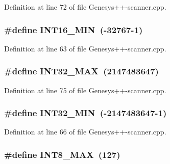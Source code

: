 Definition at line 72 of file Genesys++-\/scanner.\-cpp.

\hypertarget{_genesys_09_09-scanner_8cpp_ad4e9955955b27624963643eac448118a}{
\subsubsection[{I\-N\-T16\-\_\-\-M\-I\-N}]{\setlength{\rightskip}{0pt plus 5cm}\#define I\-N\-T16\-\_\-\-M\-I\-N~(-\/32767-\/1)}}\label{_genesys_09_09-scanner_8cpp_ad4e9955955b27624963643eac448118a}


Definition at line 63 of file Genesys++-\/scanner.\-cpp.

\hypertarget{_genesys_09_09-scanner_8cpp_a181807730d4a375f848ba139813ce04f}{
\subsubsection[{I\-N\-T32\-\_\-\-M\-A\-X}]{\setlength{\rightskip}{0pt plus 5cm}\#define I\-N\-T32\-\_\-\-M\-A\-X~(2147483647)}}\label{_genesys_09_09-scanner_8cpp_a181807730d4a375f848ba139813ce04f}


Definition at line 75 of file Genesys++-\/scanner.\-cpp.

\hypertarget{_genesys_09_09-scanner_8cpp_a688eb21a22db27c2b2bd5836943cdcbe}{
\subsubsection[{I\-N\-T32\-\_\-\-M\-I\-N}]{\setlength{\rightskip}{0pt plus 5cm}\#define I\-N\-T32\-\_\-\-M\-I\-N~(-\/2147483647-\/1)}}\label{_genesys_09_09-scanner_8cpp_a688eb21a22db27c2b2bd5836943cdcbe}


Definition at line 66 of file Genesys++-\/scanner.\-cpp.

\hypertarget{_genesys_09_09-scanner_8cpp_aaf7f29f45f1a513b4748a4e5014ddf6a}{
\subsubsection[{I\-N\-T8\-\_\-\-M\-A\-X}]{\setlength{\rightskip}{0pt plus 5cm}\#define I\-N\-T8\-\_\-\-M\-A\-X~(127)}}\label{_genesys_09_09-scanner_8cpp_aaf7f29f45f1a513b4748a4e5014ddf6a}


